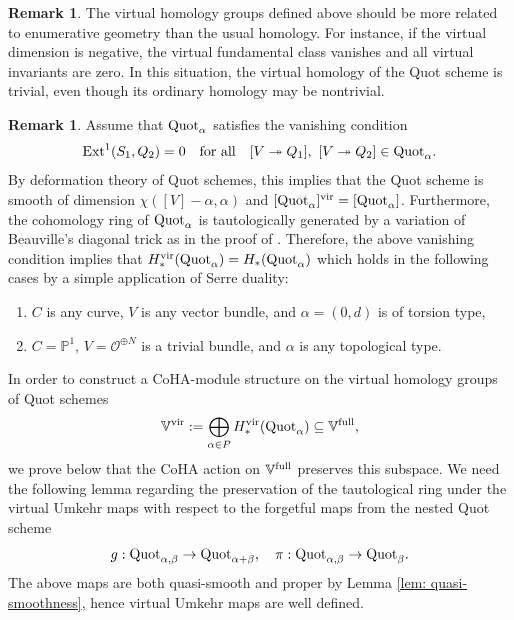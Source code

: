 \documentclass[10pt]{amsart}
\newcommand{\BP}{\mathbb{P}}
\newcommand{\BV}{\mathbb{V}}
\newcommand{\CO}{\mathcal{O}}
\newcommand{\Quot}{\textnormal{Quot}}
\newcommand{\Ext}{\textnormal{Ext}}
\newcommand{\+}{{}^+}
\newcommand{\full}{\textnormal{full}}
\newcommand{\vir}{\textnormal{vir}}
\theoremstyle{definition}
\theoremstyle {definition}
\newtheorem{remark}[theorem]{Remark}
\theoremstyle {definition}
\begin{document}
\begin{remark}
    The virtual homology groups defined above should be more related to enumerative geometry than the usual homology. For instance, if the virtual dimension is negative, the virtual fundamental class vanishes and all virtual invariants are zero. In this situation, the virtual homology of the Quot scheme is trivial, even though its ordinary homology may be nontrivial.
\end{remark}

\begin{remark}
    Assume that $\Quot_\alpha$ satisfies the vanishing condition
    \begin{equation*}
\Ext^1(S_1,Q_2)=0\quad\textnormal{for all}\quad [V\twoheadrightarrow Q_1],\ [V\twoheadrightarrow Q_2]\in \Quot_\alpha.
    \end{equation*}
    By deformation theory of Quot schemes, this implies that the Quot scheme is smooth of dimension $\chi([V]-\alpha,\alpha)$ and $[\Quot_\alpha]^\vir=[\Quot_\alpha]$. Furthermore, the cohomology ring of $\Quot_\alpha$ is tautologically generated by a variation of Beauville's diagonal trick as in the proof of \cite[Prop. 4.7]{KLMP}. Therefore, the above vanishing condition implies that $H^\vir_*(\Quot_\alpha)=H_*(\Quot_\alpha)$ which holds in the following cases by a simple application of Serre duality:
    \begin{enumerate}
        \item [(i)] $C$ is any curve, $V$ is any vector bundle, and $\alpha=(0,d)$ is of torsion type,
        \item [(ii)] $C=\BP^1$, $V=\CO^{\oplus N}$ is a trivial bundle, and $\alpha$ is any topological type. 
    \end{enumerate}
    
\end{remark}




In order to construct a CoHA-module structure on the virtual homology groups of Quot schemes
$$\BV^\vir:=\bigoplus_{\alpha\in P}H_*^\vir(\Quot_\alpha)\subseteq \BV^\full,
$$
we prove below that the CoHA action on $\BV^\full$ preserves this subspace. We need the following lemma regarding the preservation of the tautological ring under the virtual Umkehr maps with respect to the forgetful maps from the nested Quot scheme
\begin{equation}\label{eq: two forgetful maps}
    g:\Quot_{\alpha,\beta}\rightarrow \Quot_{\alpha+\beta},\quad \pi:\Quot_{\alpha,\beta}\rightarrow \Quot_\beta.
\end{equation}
The above maps are both quasi-smooth and proper by Lemma \ref{lem: quasi-smoothness}, hence virtual Umkehr maps are well defined. 
\end{document}
